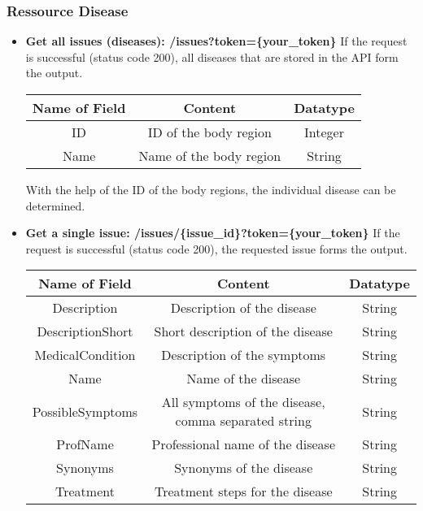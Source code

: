 \subsubsection{Ressource Disease}
\begin{itemize}
	\item \textbf{Get all issues (diseases):  /issues?token=\{your\_token\}}
	\newline
	If the request is successful (status code 200), all diseases that are stored in the API form the output.
		\begin{center}
			\begin{tabular}{ | c| c| c | } 
  				\hline
  				Name of Field& Content & Datatype \\ 
  				\hline
  				ID & ID of the body region & Integer \\ 
  				\hline
 				Name & Name of the body region & String \\ 
  				\hline
			\end{tabular}
		\end{center}
With the help of the ID of the body regions, the individual disease can be determined.
	\item \textbf{Get a single issue:  /issues/\{issue\_id\}?token=\{your\_token\}}
	\newline
If the request is successful (status code 200), the requested issue forms the output.
		\begin{center}
			\begin{tabular}{ | c| c| c | } 
  				\hline
  				Name of Field& Content & Datatype \\ 
  				\hline
  				Description & Description of the disease & String \\ 
  				\hline
 				DescriptionShort & Short description of the disease & String \\ 
  				\hline
  				MedicalCondition & Description of the symptoms & String \\ 
  				\hline
  				Name & Name of the disease & String \\ 
  				\hline
  				PossibleSymptoms & All symptoms of the disease, comma separated string & String \\ 
  				\hline
  				ProfName & Professional name of the disease & String \\ 
  				\hline
  				Synonyms & Synonyms of the disease & String \\ 
  				\hline
  				Treatment & Treatment steps for the disease & String \\
  				\hline 
			\end{tabular}
		\end{center}
\end{itemize}
